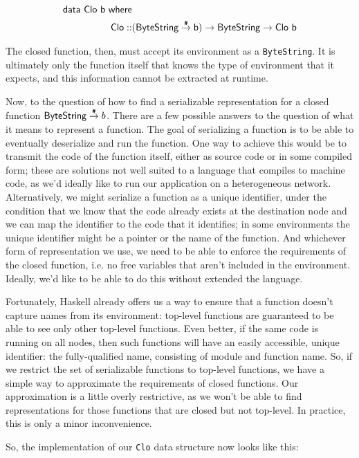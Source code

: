 \documentclass[preprint]{sigplanconf}
\begin{document}
\begin{align*}
\textsf{data}~\textsf{Clo}~\textsf{b}~\textsf{where}&\\
\textsf{Clo}::&(\textsf{ByteString} \stackrel{\texttt{\#}}{\rightarrow} \textsf{b}) \rightarrow \textsf{ByteString} \rightarrow \textsf{Clo}~\textsf{b}
\end{align*}

The closed function, then, must accept its environment as a \texttt{ByteString}. It is ultimately only the function itself that knows the type of environment that it expects, and this information cannot be extracted at runtime.

Now, to the question of how to find a serializable representation for a closed function $\textsf{ByteString} \stackrel{\texttt{\#}}{\rightarrow} b$. There are a few possible answers to the question of what it means to represent a function. The goal of serializing a function is to be able to eventually deserialize and run the function. One way to achieve this would be to transmit the code of the function itself, either as source code or in some compiled form; these are solutions not well suited to a language that compiles to machine code, as we'd ideally like to run our application on a heterogeneous network. Alternatively, we might serialize a function as a unique identifier, under the condition that we know that the code already exists at the destination node and we can map the identifier to the code that it identifies; in some environments the unique identifier might be a pointer or the name of the function. And whichever form of representation we use, we need to be able to enforce the requirements of the closed function, i.e. no free variables that aren't included in the environment. Ideally, we'd like to be able to do this without extended the language.

Fortunately, Haskell already offers us a way to ensure that a function doesn't capture names from its environment: top-level functions are guaranteed to be able to see only other top-level functions. Even better, if the same code is running on all nodes, then such functions will have an easily accessible, unique identifier: the fully-qualified name, consisting of module and function name. So, if we restrict the set of serializable functions to top-level functions, we have a simple way to approximate the requirements of closed functions. Our approximation is a little overly restrictive, as we won't be able to find representations for those functions that are closed but not top-level. In practice, this is only a minor inconvenience.

So, the implementation of our \texttt{Clo} data structure now looks like this:
\end{document}
